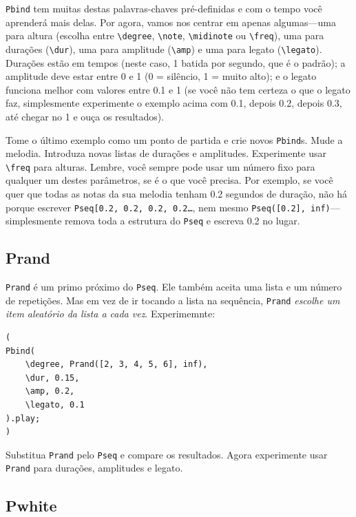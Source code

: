 \texttt{Pbind} tem muitas destas palavras-chaves pré-definidas e com o tempo você aprenderá mais delas. Por agora, vamos nos centrar em apenas algumas---uma para altura (escolha entre \texttt{\textbackslash degree}, \texttt{\textbackslash note}, \texttt{\textbackslash midinote} ou \texttt{\textbackslash freq}), uma para durações (\texttt{\textbackslash dur}), uma para amplitude (\texttt{\textbackslash amp}) e uma para legato (\texttt{\textbackslash legato}). Durações estão em tempos (neste caso, 1 batida por segundo, que é o padrão); a amplitude deve estar entre 0 e 1 (0 = silêncio, 1 = muito alto); e o legato funciona melhor com valores entre 0.1 e 1 (se você não tem certeza o que o legato faz, simplesmente experimente o exemplo acima com 0.1, depois 0.2, depois 0.3, até chegar no 1 e ouça os resultados).

Tome o último exemplo como um  ponto de partida e crie novos \texttt{Pbind}s. Mude a melodia. Introduza novas listas de durações e amplitudes. Experimente usar \texttt{\textbackslash freq} para alturas. Lembre, você sempre pode usar um número fixo para qualquer um destes parâmetros, se é o que você precisa. Por exemplo, se você quer que todas as notas da sua melodia tenham 0.2 segundos de duração, não há porque escrever \texttt{Pseq[0.2, 0.2, 0.2, 0.2\dots}, nem mesmo \texttt{Pseq([0.2], inf)}---simplesmente remova toda a estrutura do \texttt{Pseq} e escreva 0.2 no lugar.

\subsection{Prand}

\texttt{Prand} é um primo próximo do \texttt{Pseq}. Ele também aceita uma lista e um número de repetições. Mas em vez de ir tocando a lista na sequência, \texttt{Prand} \emph{escolhe um item aleatório da lista a cada vez}. Experimemnte:

 
\begin{lstlisting}[style=SuperCollider-IDE, basicstyle=\scttfamily\footnotesize]
(
Pbind(
	\degree, Prand([2, 3, 4, 5, 6], inf),
	\dur, 0.15,
	\amp, 0.2,
	\legato, 0.1
).play;
)
\end{lstlisting}
 

Substitua \texttt{Prand} pelo \texttt{Pseq} e compare os resultados. Agora experimente usar \texttt{Prand} para durações, amplitudes e legato.

\subsection{Pwhite}

